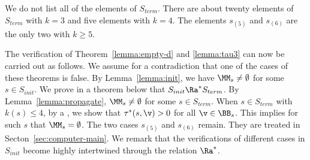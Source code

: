 We do not list all of the elements of $S_{term}$.  There are about twenty
elements of $S_{term}$ with $k=3$ and five elements with $k=4$.  The elements
$s_{(5)}$ and $s_{(6)}$ are the only two with $k\ge 5$.

\begin{remark}
The verification of 
Theorem~\ref{lemma:empty-d} and \ref{lemma:tau3} can now be
carried out as follows.  We assume for a contradiction that
one of the cases of these theorems is false.  By Lemma~\ref{lemma:init}, we have
$\MM_s\ne\emptyset$ for some $s\in S_{init}$.  We prove in a theorem
below that $S_{init}\Ra^* S_{term}$.  By Lemma~\ref{lemma:propagate},
$\MM_s\ne\emptyset$ for some $s\in S_{term}$.  When $s\in S_{term}$
with $k(s)\le 4$, by a , we show
that $\tau^*(s,\v) >0$ for all $\v\in \BB_s$.  This implies for such $s$
that $\MM_s=\emptyset$.  The two cases $s_{(5)}$ and $s_{(6)}$ remain.
They are treated in Secton~\ref{sec:computer-main}.
We remark that the verifications of  different cases in $S_{init}$ become
highly intertwined through the relation $\Ra^*$.
\end{remark}